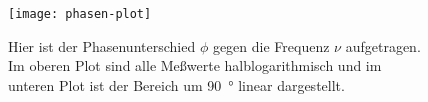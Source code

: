 \begin{figure}[h]
  \centering
  \texttt{[image: phasen-plot]}
  \caption{Hier ist der Phasenunterschied $\phi$ gegen die Frequenz
    $\nu$ aufgetragen. Im oberen Plot sind alle Meßwerte
    halblogarithmisch und im unteren Plot ist der Bereich um
    \SI{90}{\degree} linear dargestellt.}
  \label{fig:phasen-plot}
\end{figure}
